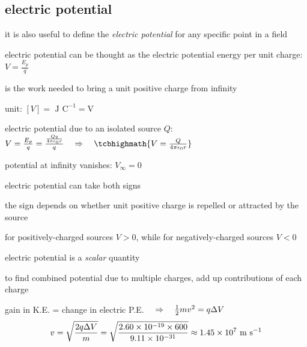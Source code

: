\subsection{electric potential}

it is also useful to define the \emph{electric potential} for any specific point in a field

electric potential can be thought as the electric potential energy per unit charge: $V = \frac{E_p}{q}$

\begin{ilight}
	 is the work needed to bring a unit positive charge from infinity
\end{ilight}

\cmt unit: $[V] = \text{ J C}^{-1} = \text{V}$

\cmt electric potential due to an isolated source $Q$: $V = \frac{E_p}{q} = \frac{\frac{Qq}{\ec r}}{q} \RA \tcbhighmath{V = \frac{Q}{4\pi\epsilon_0 r}}$

\cmt potential at infinity vanishes: $V_\infty = 0$

\cmt electric potential can take both signs

the sign depends on whether unit positive charge is repelled or attracted by the source

for positively-charged sources $V>0$, while for negatively-charged sources $V<0$

\cmt electric potential is a \emph{scalar} quantity

to find combined potential due to multiple charges, add up contributions of each charge


\begin{soln} gain in K.E. = change in electric P.E. $\quad \Rightarrow \quad \frac{1}{2}mv^2 = q\Delta V$
\eqyskip\begin{equation*}
	v = \sqrt{\frac{2q\Delta V}{m}} = \sqrt{\frac{2\time 1.60\times10^{-19}\times600}{9.11\times10^{-31}}} \approx 1.45\times10^7 \mps 
\end{equation*}
\end{soln}



